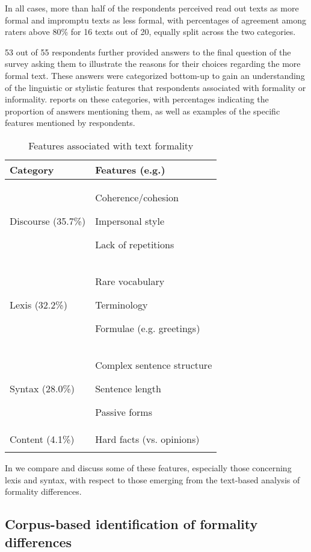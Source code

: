 \documentclass[output=paper]{langscibook}
\begin{document}
In all cases, more than half of the respondents perceived read out texts as more formal and impromptu texts as less formal, with percentages of agreement among raters above 80\% for 16 texts out of 20, equally split across the two categories. 

53 out of 55 respondents further provided answers to the final question of the survey asking them to illustrate the reasons for their choices regarding the more formal text. These answers were categorized bottom-up to gain an understanding of the linguistic or stylistic features that respondents associated with formality or informality.  reports on these categories, with percentages indicating the proportion of answers mentioning them, as well as examples of the specific features mentioned by respondents.

\begin{table}
\begin{tabularx}{\textwidth}{XX}

\lsptoprule

{\bfseries Category} & {\bfseries Features (e.g.)}\\
\midrule
Discourse (35.7\%) & Coherence/cohesion

Impersonal style

Lack of repetitions\\
\tablevspace
Lexis (32.2\%) & Rare vocabulary

Terminology

Formulae (e.g. greetings)\\
\tablevspace
Syntax (28.0\%) & Complex sentence structure

Sentence length

Passive forms\\
\tablevspace
Content (4.1\%) & Hard facts (vs. opinions)\\
\lspbottomrule
\end{tabularx}
\caption{Features associated with text formality}
\label{tab:ivaska:4}
\end{table}

In  we compare and discuss some of these features, especially those concerning lexis and syntax, with respect to those emerging from the text-based analysis of formality differences.



\subsection{ Corpus-based identification of formality differences} \label{sec:ivaska:4.2}
\end{document}
